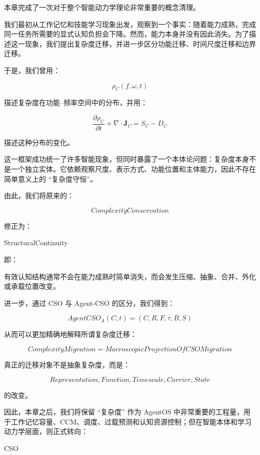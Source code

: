 本章完成了一次对于整个智能动力学理论非常重要的概念清理。

我们最初从工作记忆和技能学习现象出发，观察到一个事实：随着能力成熟，完成同一任务所需要的显式认知负担会下降。然而，能力本身并没有因此消失。为了描述这一现象，我们提出复杂度迁移，并进一步区分功能迁移、时间尺度迁移和边界迁移。

于是，我们曾用：

\[
\rho_C(f,\omega,t)
\]

描述复杂度在功能--频率空间中的分布，并用：

\[
\frac{\partial \rho_C}{\partial t}
+
\nabla\cdot\mathbf J_C
=
S_C-D_C
\]

描述这种分布的变化。

这一框架成功统一了许多智能现象，但同时暴露了一个本体论问题：复杂度本身不是一个独立实体。它依赖观察尺度、表示方式、功能位置和主体能力，因此不存在简单意义上的 ``复杂度守恒''。

由此，我们将原来的：

\[
ComplexityConservation
\]

修正为：

\begin{statementbox}
StructuralContinuity
\end{statementbox}

即：

\begin{statementbox}
有效认知结构通常不会在能力成熟时简单消失，而会发生压缩、抽象、合并、外化或承载位置改变。
\end{statementbox}

进一步，通过 CSO 与 Agent-CSO 的区分，我们得到：

\[
AgentCSO_A(C,t)
=
(C,R,F,\tau,B,S)
\]

从而可以更加精确地解释所谓复杂度迁移：

\[
\boxed{
ComplexityMigration
=
MacroscopicProjectionOfCSOMigration
}
\]

真正的迁移对象不是抽象复杂度，而是：

\[
\boxed{
Representation,
Function,
Timescale,
Carrier,
State
}
\]

的改变。

因此，本章之后，我们将保留 ``复杂度'' 作为 AgentOS 中非常重要的工程量，用于工作记忆容量、CCM、调度、过载预测和认知资源控制；但在智能本体和学习动力学层面，则正式转向：

\begin{statementbox}
CSO
\end{statementbox}

